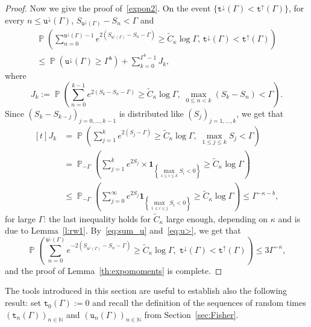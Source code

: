 \documentclass[10pt]{amsart}
\theoremstyle{definition}\newtheorem{defi}[theo]{Definition}\newtheorem{rema}[theo]{Remark}\newtheorem{exam}[theo]{Example}\newtheorem{exem}[theo]{Example}\newtheorem{nota}[theo]{Notation}
\newcommand{\ind}{\mathbf{1}}
\newcommand{\bbN}{\mathbb{N}}
\newcommand{\gG}{\Gamma}
\renewcommand*\ss{\mathtt{u}}
\newcommand{\ttt}{\mathtt{t}}
\newcommand*\td{{\ttt}^\downarrow}
\newcommand*\tup{{\ttt}^\uparrow}
\newcommand{\tudown}{\ss^\downarrow}
\DeclareMathOperator{\p}{\mathbb{P}}
\begin{document}
\begin{proof}
Now we give the proof of~\eqref{expon2}. On the event $\{\td(\Gamma)< \tup(\Gamma)\}$, for every $n \le \tudown(\Gamma)$, $S_{\tudown(\Gamma)} - S_n < \Gamma$ and
\begin{multline}
\p\left(\sum_{n=0}^{\tudown(\Gamma)-1} e^{2\left(S_{\tudown(\gG)}-S_n-\Gamma\right)}
\ge \widetilde{C}_\kappa \log \Gamma, \,\td(\Gamma)< \tup(\Gamma)\right)\\
\le
\p\left(\tudown(\Gamma)\ge \Gamma^b\right) + \sum_{k=0}^{\Gamma^b-1} J_k,\label{eq:sum_u}
\end{multline}
where
\begin{equation}
J_k:= \p\left(\sum_{n=0}^{k-1} e^{2 \left(S_k-S_n-\Gamma\right)} \ge \widetilde{C}_\kappa \log \Gamma,\; \max_{0\le n < k} (S_k-S_n) < \Gamma\right).
\end{equation}
Since $(S_k-S_{k-j})_{j=0,\dots, k-1}$ is distributed like $(S_j)_{j=1,\dots, k}$, we get that
\begin{equation}
\begin{aligned}[t]
J_k &= \p\left(\sum_{j=1}^k e^{2 (S_j-\Gamma)} \ge \widetilde{C}_\kappa \log \Gamma,\; \max_{1\le j\le k} S_j < \Gamma \right)\\
&= \p_{-\Gamma}\left(\sum_{j=1}^k e^{2 S_j} \times \ind_{\left\{\max_{1\le i\le k} S_i< 0\right\}} \ge \widetilde{C}_\kappa \log \Gamma \right)
\\
&\le
\p_{-\Gamma}\left(\sum_{j=0}^\infty e^{2 S_j} \ind_{\left\{\max_{1\le i\le j} S_i< 0\right\}} \ge \widetilde{C}_\kappa \log \Gamma \right)
\le \Gamma^{-\kappa-b},
\end{aligned}
\end{equation}
\pagebreak{}
for large $\Gamma$: the last inequality holds for $\widetilde{C}_\kappa$ large enough, depending on $\kappa$ and is due to Lemma~\ref{l:rw1}. By~\eqref{eq:sum_u} and~\eqref{eq:u>}, we get that
\begin{equation}
\p\left(\sum_{n=0}^{\tudown(\Gamma)} e^{-2 (S_{\tudown(\Gamma)}-S_n-\gG)} \ge \widetilde{C}_\kappa\log \Gamma,\; \td(\Gamma)< \tup(\Gamma)\right) \le 3 \Gamma^{-\kappa},
\end{equation}
and the proof of Lemma~\ref{th:expomoments} is complete.
\end{proof}


The tools introduced in this section are useful to establish also the following result: set $\ttt_0(\Gamma):=0$ and recall the definition of the sequences of random times $(\ttt_n(\Gamma))_{n\in \bbN}$ and $(\ss_n(\Gamma))_{n\in \bbN}$ from Section~\ref{sec:Fisher}.
\end{document}
